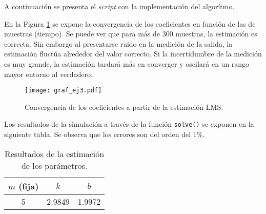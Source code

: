	
	A continuación se presenta el \emph{script} con la implementación del algorítmo. 
	

	En la Figura \ref{fig:ej3} se expone la convergencia de los coeficientes en función de las de muestras (tiempo). Se puede ver que para más de 300 muestras, la estimación es correcta. Sin embargo al presentarse ruido en la medición de la salida, la estimación fluctúa alrededor del valor correcto. Si la incertidumbre de la medición es muy grande, la estimación tardará más en converger y oscilará en un rango mayor entorno al verdadero.

	\begin{figure}[h!]
		\centering
		\texttt{[image: graf\_ej3.pdf]}
		\caption{Convergencia de los coeficientes a partir de la estimación LMS.}
		\label{fig:ej3}
	\end{figure}

	
	Los resultados de la simulación a través de la función \texttt{solve()} se exponen en la siguiente tabla. Se observa que los errores son del orden del 1\%.

		\begin{table}[h!]
			\centering
			\begin{tabular}{ccc}
				\toprule
				$m$ (fija)	& $k$	& $b$\\
				\midrule
				5&\num{2.9849}&\num{1.9972}\\
				\bottomrule
			\end{tabular}
			\caption{Resultados de la estimación de los parámetros.}
			\label{tab:res_ej3}
		\end{table}


